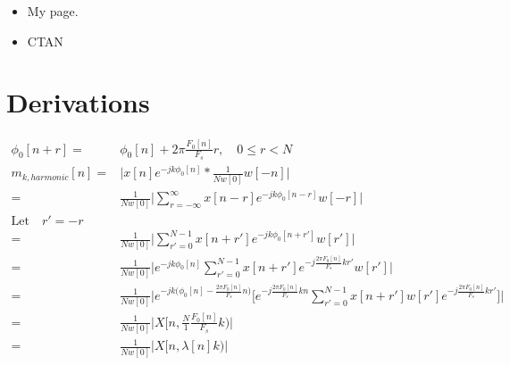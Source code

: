 \documentclass [11pt, proquest] {uwthesis}[2015/03/03]
\begin{document}
\begin{itemize}
\item My page.
\begin{description}
\item[] \verb%http://staff.washington.edu/fox/tex/uwthesis.html%
\end{description}

\item CTAN

\end{itemize}

\chapter{Derivations}


\begin{align}
\phi_0[n + r] =& \phi_0[n] + 2\pi \frac{F_0[n]}{F_s}r, \quad 0 \leq r < N \\
m_{k,harmonic}[n] =& \Bigg| x[n] e^{-jk\phi_0 [n]} *  \frac{1}{Nw[0]} w[-n] \Bigg| \nonumber \\
=& \frac{1}{Nw[0]} \Bigg| \sum_{r = -\infty}^\infty x[n - r] e^{-jk\phi_0 [n-r]} w[-r] \Bigg| \nonumber \\
\textrm{Let} \quad r' = -r \nonumber \\
=& \frac{1}{Nw[0]} \Bigg| \sum_{r' = 0}^{N-1} x[n + r'] e^{-jk\phi_0 [n + r']} w[r'] \Bigg|  \nonumber \\
=& \frac{1}{Nw[0]} \Bigg| e^{-jk \phi_0[n]} \sum_{r' = 0}^{N-1} x[n + r'] e^{-j \frac{2\pi F_0[n]}{F_s}kr'} w[r'] \Bigg| \nonumber \\
=& \frac{1}{Nw[0]} \Bigg| e^{-jk \Big(\phi_0[n] - \frac{2\pi F_0[n]}{F_s}n \Big)} \Bigg[ e^{-j \frac{2\pi F_0[n]}{F_s}kn} \sum_{r' = 0}^{N-1} x[n + r'] w[r'] e^{-j \frac{2\pi F_0[n]}{F_s}kr'} \Bigg] \Bigg| \nonumber \\
=& \frac{1}{Nw[0]} \Bigg| X\Big[n, \frac{N}{1} \frac{F_0[n]}{F_s} k \Big) \Bigg| \nonumber \\
\label{eq:harmonic-to-stft}
=& \frac{1}{Nw[0]} \Bigg| X\Big[n, \lambda[n]k\Big) \Bigg|
\end{align}

\end{document}

